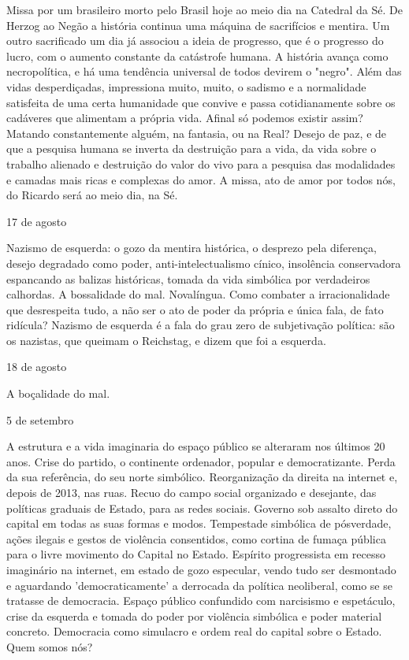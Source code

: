 Missa por um brasileiro morto pelo Brasil hoje ao meio dia na Catedral
da Sé. De Herzog ao Negão a história continua uma máquina de sacrifícios
e mentira. Um outro sacrificado um dia já associou a ideia de progresso,
que é o progresso do lucro, com o aumento constante da catástrofe
humana. A história avança como necropolítica, e há uma tendência
universal de todos devirem o "negro". Além das vidas desperdiçadas,
impressiona muito, muito, o sadismo e a normalidade satisfeita de uma
certa humanidade que convive e passa cotidianamente sobre os cadáveres
que alimentam a própria vida. Afinal só podemos existir assim? Matando
constantemente alguém, na fantasia, ou na Real? Desejo de paz, e de que
a pesquisa humana se inverta da destruição para a vida, da vida sobre o
trabalho alienado e destruição do valor do vivo para a pesquisa das
modalidades e camadas mais ricas e complexas do amor. A missa, ato de
amor por todos nós, do Ricardo será ao meio dia, na Sé.

17 de agosto

Nazismo de esquerda: o gozo da mentira histórica, o desprezo pela
diferença, desejo degradado como poder, anti-intelectualismo cínico,
insolência conservadora espancando as balizas históricas, tomada da vida
simbólica por verdadeiros calhordas. A bossalidade do mal. Novalíngua.
Como combater a irracionalidade que desrespeita tudo, a não ser o ato de
poder da própria e única fala, de fato ridícula? Nazismo de esquerda é a
fala do grau zero de subjetivação política: são os nazistas, que queimam
o Reichstag, e dizem que foi a esquerda.

18 de agosto

A boçalidade do mal.

5 de setembro

A estrutura e a vida imaginaria do espaço público se alteraram nos
últimos 20 anos. Crise do partido, o continente ordenador, popular e
democratizante. Perda da sua referência, do seu norte simbólico.
Reorganização da direita na internet e, depois de 2013, nas ruas. Recuo
do campo social organizado e desejante, das políticas graduais de
Estado, para as redes sociais. Governo sob assalto direto do capital em
todas as suas formas e modos. Tempestade simbólica de pósverdade, ações
ilegais e gestos de violência consentidos, como cortina de fumaça
pública para o livre movimento do Capital no Estado. Espírito
progressista em recesso imaginário na internet, em estado de gozo
especular, vendo tudo ser desmontado e aguardando 'democraticamente' a
derrocada da política neoliberal, como se se tratasse de democracia.
Espaço público confundido com narcisismo e espetáculo, crise da esquerda
e tomada do poder por violência simbólica e poder material concreto.
Democracia como simulacro e ordem real do capital sobre o Estado. Quem
somos nós?

